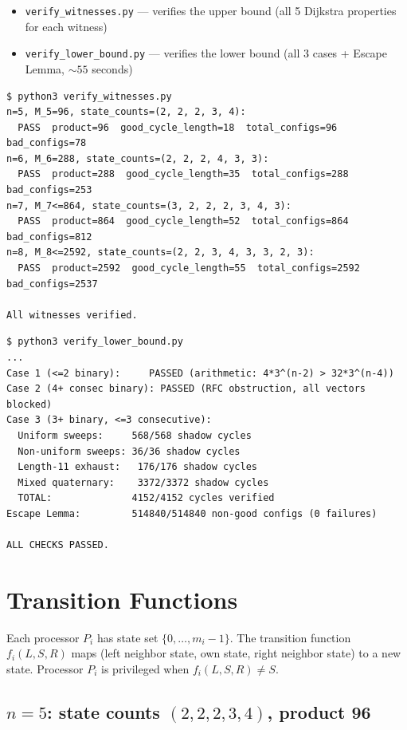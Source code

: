 \documentclass[11pt]{article}
\begin{document}
\begin{itemize}
\item \texttt{verify\_witnesses.py} --- verifies the upper bound (all 5 Dijkstra properties for each witness)
\item \texttt{verify\_lower\_bound.py} --- verifies the lower bound (all 3 cases + Escape Lemma, ${\sim}55$ seconds)
\end{itemize}

\begin{verbatim}
$ python3 verify_witnesses.py
n=5, M_5=96, state_counts=(2, 2, 2, 3, 4):
  PASS  product=96  good_cycle_length=18  total_configs=96  bad_configs=78
n=6, M_6=288, state_counts=(2, 2, 2, 4, 3, 3):
  PASS  product=288  good_cycle_length=35  total_configs=288  bad_configs=253
n=7, M_7<=864, state_counts=(3, 2, 2, 2, 3, 4, 3):
  PASS  product=864  good_cycle_length=52  total_configs=864  bad_configs=812
n=8, M_8<=2592, state_counts=(2, 2, 3, 4, 3, 3, 2, 3):
  PASS  product=2592  good_cycle_length=55  total_configs=2592  bad_configs=2537

All witnesses verified.
\end{verbatim}

\begin{verbatim}
$ python3 verify_lower_bound.py
...
Case 1 (<=2 binary):     PASSED (arithmetic: 4*3^(n-2) > 32*3^(n-4))
Case 2 (4+ consec binary): PASSED (RFC obstruction, all vectors blocked)
Case 3 (3+ binary, <=3 consecutive):
  Uniform sweeps:     568/568 shadow cycles
  Non-uniform sweeps: 36/36 shadow cycles
  Length-11 exhaust:   176/176 shadow cycles
  Mixed quaternary:    3372/3372 shadow cycles
  TOTAL:              4152/4152 cycles verified
Escape Lemma:         514840/514840 non-good configs (0 failures)

ALL CHECKS PASSED.
\end{verbatim}

\section{Transition Functions}

Each processor $P_i$ has state set $\{0, \ldots, m_i - 1\}$. The transition function $f_i(L, S, R)$ maps (left neighbor state, own state, right neighbor state) to a new state. Processor $P_i$ is privileged when $f_i(L, S, R) \ne S$.

\subsection*{$n = 5$: state counts $(2, 2, 2, 3, 4)$, product 96}
\end{document}
